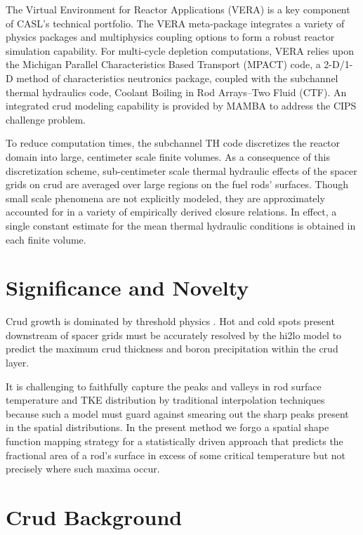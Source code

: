 The Virtual Environment for Reactor Applications (VERA) is a key component of
CASL's technical portfolio.  The VERA meta-package integrates a variety of physics
packages and multiphysics coupling options to form a robust reactor simulation
capability.  For multi-cycle depletion computations, VERA relies upon the Michigan Parallel Characteristics Based Transport (MPACT) code, a
2-D/1-D method of characteristics neutronics package, coupled with the subchannel
thermal hydraulics code, Coolant Boiling in Rod Arrays–Two Fluid (CTF).
An integrated crud modeling capability
is provided by MAMBA to address the CIPS challenge problem.

To reduce computation times, the subchannel TH code discretizes the reactor
domain into large, centimeter scale finite volumes. As a consequence of this
discretization scheme, sub-centimeter scale thermal hydraulic effects of the
spacer grids on crud are averaged over large regions on the fuel rods'
surfaces.  Though small scale phenomena are not explicitly modeled, they are
approximately accounted for in a variety of empirically derived closure
relations.  In effect, a single constant estimate for the mean thermal
hydraulic conditions is obtained in each finite volume. 

\section{Significance and Novelty}

Crud growth is dominated by threshold physics \cite{mongoose17}.  Hot and cold spots
present downstream of spacer grids must be accurately resolved by the hi2lo model to predict the maximum crud
thickness and boron precipitation within the crud layer.

It is challenging to faithfully capture the peaks and valleys in
rod surface temperature and TKE distribution by traditional interpolation
techniques because such a model must guard against smearing out the sharp peaks
present in the spatial distributions.
In the present method we forgo a spatial shape function mapping strategy
for a statistically driven approach that predicts the fractional
area of a rod's surface in excess of some critical temperature but not
precisely where such maxima occur.

\section{Crud Background} 

